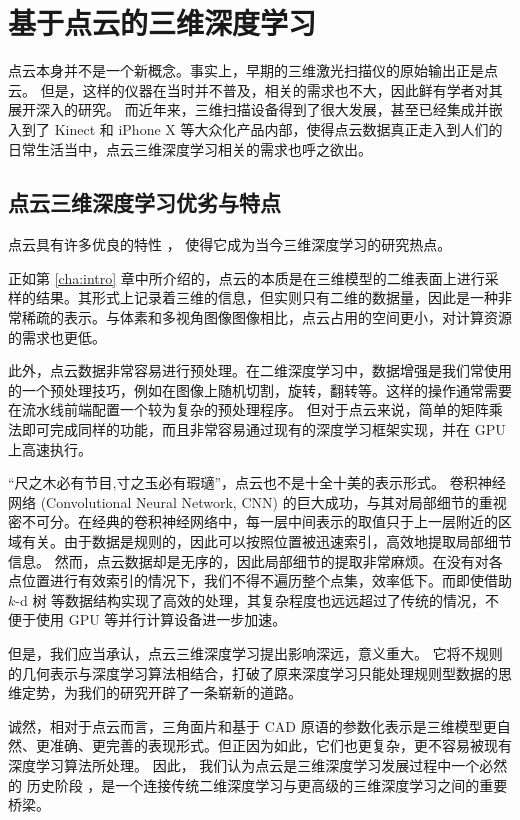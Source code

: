 \chapter{基于点云的三维深度学习}
\label{cha:3d_deep_learning}

点云本身并不是一个新概念。事实上，早期的三维激光扫描仪的原始输出正是点云。
但是，这样的仪器在当时并不普及，相关的需求也不大，因此鲜有学者对其展开深入的研究。%
而近年来，三维扫描设备得到了很大发展，甚至已经集成并嵌入到了 Kinect 和 iPhone X 等大众化产品内部，使得点云数据真正走入到人们的日常生活当中，点云三维深度学习相关的需求也呼之欲出。


\section{点云三维深度学习优劣与特点 \label{section:pcintro}}
点云具有许多优良的特性
，%
使得它成为当今三维深度学习的研究热点。

正如第 \ref{cha:intro} 章中所介绍的，点云的本质是在三维模型的二维表面上进行采样的结果。其形式上记录着三维的信息，但实则只有二维的数据量，因此是一种非常稀疏的表示。与体素和多视角图像图像相比，点云占用的空间更小，对计算资源的需求也更低。

此外，点云数据非常容易进行预处理。在二维深度学习中，数据增强是我们常使用的一个预处理技巧\cite{alexnet}，例如在图像上随机切割，旋转，翻转等。这样的操作通常需要在流水线前端配置一个较为复杂的预处理程序。
但对于点云来说，简单的矩阵乘法即可完成同样的功能\cite{pointnet}，而且非常容易通过现有的深度学习框架实现，并在 GPU 上高速执行。


“尺之木必有节目,寸之玉必有瑕瓋”，点云也不是十全十美的表示形式。
卷积神经网络 (Convolutional Neural Network, CNN) 的巨大成功\cite{lenet5, alexnet, vgg, googlenet, resnet}，与其对局部细节的重视密不可分。在经典的卷积神经网络中，每一层中间表示的取值只于上一层附近的区域有关。由于数据是规则的，因此可以按照位置被迅速索引，高效地提取局部细节信息。%
然而，点云数据却是无序的，因此局部细节的提取非常麻烦。在没有对各点位置进行有效索引的情况下，我们不得不遍历整个点集，效率低下。而即使借助 $k$-d 树 等数据结构实现了高效的处理，其复杂程度也远远超过了传统的情况，不便于使用 GPU 等并行计算设备进一步加速。


但是，我们应当承认，点云三维深度学习提出影响深远，意义重大。
它将不规则的几何表示与深度学习算法相结合，打破了原来深度学习只能处理规则型数据的思维定势，为我们的研究开辟了一条崭新的道路。

诚然，相对于点云而言，三角面片和基于 CAD 原语的参数化表示是三维模型更自然、更准确、更完善的表现形式。但正因为如此，它们也更复杂，更不容易被现有深度学习算法所处理。
因此，%
我们认为点云是三维深度学习发展过程中一个必然的
历史阶段
，是一个连接传统二维深度学习与更高级的三维深度学习之间的重要桥梁。


